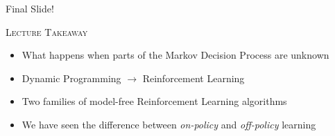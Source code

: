 \documentclass{beamer}
\newenvironment{takeaway}[1]{%
	\definecolor{shadecolor}{gray}{0.9}%
		\begin{shaded}{\color{skymagenta}\noindent\textsc{#1}}\\%
		}{%
		\end{shaded}%
}
\begin{document}
\begin{frame}{Final Slide!}
	\begin{takeaway}{Lecture Takeaway}
		\begin{itemize}
			\item What happens when parts of the Markov Decision Process are unknown
			\item Dynamic Programming $\rightarrow$ Reinforcement Learning
			\item Two families of model-free Reinforcement Learning algorithms
			\item We have seen the difference between \textit{on-policy} and \textit{off-policy} learning
		\end{itemize}

	\end{takeaway}
\end{frame}

\end{document}
